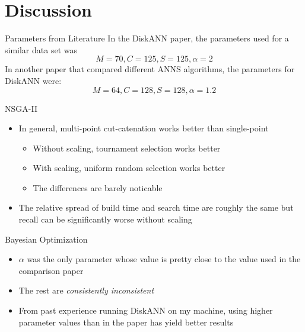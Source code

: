 \section{Discussion}

\begin{frame}{Parameters from Literature}
    In the DiskANN paper, the parameters used for a similar data set was
    \[
        M=70, C=125, S=125, \alpha=2
    \]
    In another paper that compared different ANNS algorithms, the parameters for DiskANN were:
    \[
        M=64, C=128, S=128, \alpha=1.2
    \]
\end{frame}

\begin{frame}{NSGA-II}
    \begin{itemize}
        \item In general, multi-point cut-catenation works better than single-point
            \begin{itemize}
                \item Without scaling, tournament selection works better
                \item With scaling, uniform random selection works better
                \item The differences are barely noticable
            \end{itemize}
        \item The relative spread of build time and search time are roughly the same but recall can be significantly worse without scaling
    \end{itemize}
\end{frame}

\begin{frame}{Bayesian Optimization}
    \begin{itemize}
        \item \(\alpha\) was the only parameter whose value is pretty close to the value used in the comparison paper
        \item The rest are \textit{consistently inconsistent}
        \item From past experience running DiskANN on my machine, using higher parameter values than in the paper has yield better results
    \end{itemize}
\end{frame}

